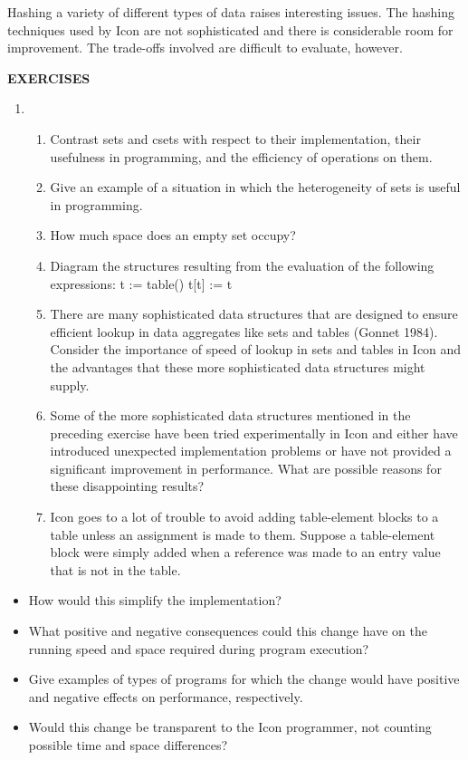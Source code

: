 Hashing a variety of different types of data raises interesting
issues. The hashing techniques used by Icon are not sophisticated and
there is considerable room for improvement. The trade-offs involved
are difficult to evaluate, however.

{\sffamily\bfseries EXERCISES}

\liststyleLvii
\begin{enumerate}
\item \begin{enumerate}

\item Contrast sets and csets with respect to their implementation,
their usefulness in programming, and the efficiency of operations on
them.

\item Give an example of a situation in which the heterogeneity of
sets is useful in programming.

\item How much space does an empty set occupy?

\item Diagram the structures resulting from the evaluation of the
following expressions:\newline
 t := table()\newline
 t[t] := t

\item There are many sophisticated data structures that are designed
to ensure efficient lookup in data aggregates like sets and tables
(Gonnet 1984). Consider the importance of speed of lookup in sets and
tables in Icon and the advantages that these more sophisticated data
structures might supply.

\item Some of the more sophisticated data structures mentioned in the
preceding exercise have been tried experimentally in Icon and either
have introduced unexpected implementation problems or have not
provided a significant improvement in performance. What are possible
reasons for these disappointing results?

\item Icon goes to a lot of trouble to avoid adding table-element
blocks to a table unless an assignment is made to them.  Suppose a
table-element block were simply added when a reference was made to an
entry value that is not in the table.
\end{enumerate}
\end{enumerate}
\liststyleLviii
\begin{itemize}
\item How would this simplify the implementation?

\item What positive and negative consequences could this change have
on the running speed and space required during program execution?

\item Give examples of types of programs for which the change would
have positive and negative effects on performance, respectively.

\item Would this change be transparent to the Icon programmer, not
counting possible time and space differences?
\end{itemize}
